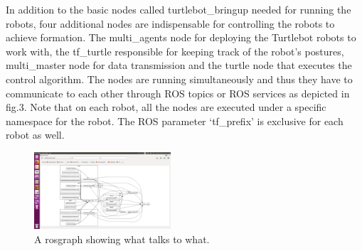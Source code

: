 \documentclass[journal]{IEEEtran}
\begin{document}
In addition to the basic nodes called turtlebot{\_}bringup needed for running the robots, four additional nodes are indispensable for controlling the robots to achieve formation. 
The multi{\_}agents node for deploying the Turtlebot robots to work with, the tf{\_}turtle responsible for keeping track of the robot's postures, multi{\_}master node for data transmission and the turtle node that executes the control algorithm. The nodes are running simultaneously and thus they have to communicate to each other through ROS topics or ROS services as depicted in fig.3. Note that on each robot, all the nodes are executed under a specific namespace for the robot. The ROS parameter ‘tf{\_}prefix’ is exclusive for each robot as well.
\begin{figure}[!h]
\begin{center}
\includegraphics[width=2in]{4.png}
\caption{A rosgraph showing what talks to what.}
\end{center}
\label{fig2:mypicture2}
\end{figure}
\end{document}
